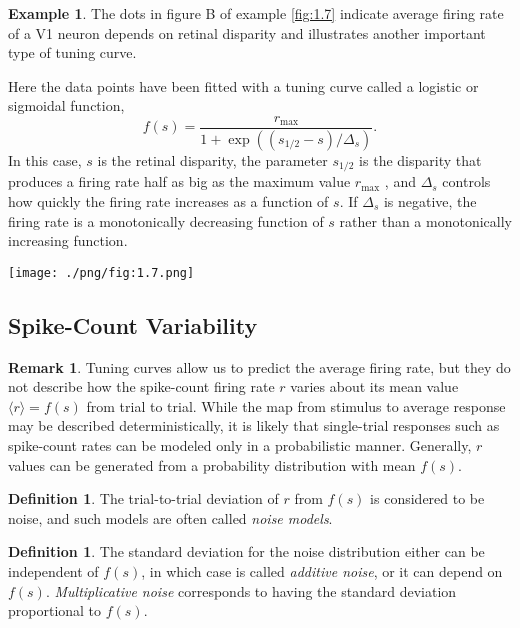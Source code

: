\documentclass[letterpaper,oneside]{book}
\numberwithin{equation}{chapter}
\theoremstyle{definition}
\newtheorem{defn}[thm]{Definition}
\newtheorem{exm}[thm]{Example}
\newtheorem{rem}{Remark}[chapter]
\begin{document}
\begin{multicols}{2}
\begin{exm}
The dots in figure B of example \ref{fig:1.7} indicate average firing rate of a V1 neuron depends on
retinal disparity and illustrates another important type of tuning curve.

Here the data points have been fitted with a tuning curve called
a logistic or sigmoidal function,
\begin{equation}
  \label{equ:1.17}
  f(s)=\frac{r_{\text{max}}}{1+\exp\left(\left(s_{1/2}-s\right)/\Delta_s\right)}.
\end{equation}
In this case, $s$ is the retinal disparity, the parameter $s_{1/2}$ is the disparity
that produces a firing rate half as big as the maximum value $r_{\text{max}}$ , and $\Delta_s$
controls how quickly the firing rate increases as a function of $s$. If $\Delta_s$ is
negative, the firing rate is a monotonically decreasing function of $s$ rather
than a monotonically increasing function.
\begin{center}
  \texttt{[image: ./png/fig:1.7.png]}
\end{center}
\end{exm}

\subsection{Spike-Count Variability}
\begin{rem}
  Tuning curves allow us to predict the average firing rate, but they do not
describe how the spike-count firing rate $r$ varies about its mean value $\langle r\rangle=f(s) $ 
from trial to trial. While the map from stimulus to average
response may be described deterministically, it is likely that single-trial
responses such as spike-count rates can be modeled only in a probabilistic manner.
Generally, $r$ values can be generated from a probability
distribution with mean $f(s)$.
\end{rem}

\begin{defn}
  The trial-to-trial deviation of $r$ from $f ( s )$ is
considered to be noise, and such models are often called \emph{noise models}.
\end{defn}
\begin{defn}
  The standard deviation for the noise distribution either can be independent of 
  $f ( s )$, in which case is called \emph{additive noise}, or it can
depend on $f ( s )$. \emph{Multiplicative noise} corresponds to having the standard
deviation proportional to $f ( s )$.
\end{defn}



%
%
%
\end{multicols}
\end{document}
